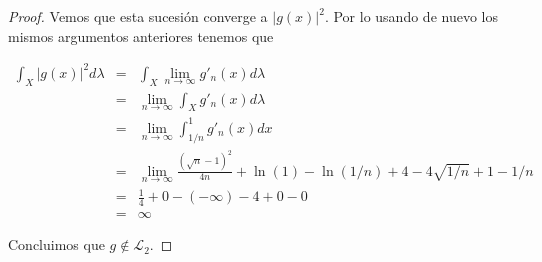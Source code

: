 \documentclass[letter,twoside,12pt]{article}
\numberwithin{equation}{section}
\begin{document}
\begin{enumerate}[label = (\textbf{\arabic*.})]
\begin{proof}
Vemos que esta sucesión converge a $|g(x)|^2 $. Por lo usando de nuevo los mismos argumentos anteriores tenemos que

\begin{eqnarray*}
 \int_X |g(x)|^2d\lambda &=& \int_X \lim_{n \to \infty} g'_n(x)d\lambda
 \\&=&\lim_{n \to \infty} \int_X g'_n(x)d\lambda 
 \\&=& \lim_{n \to \infty} \int_{1/n}^1 g'_n(x)dx
 \\&=& \lim_{n \to \infty} \frac{(\sqrt{n}-1)^2}{4n}+\ln(1)-\ln(1/n) +4-4\sqrt{1/n}+1-1/n
 \\&=& \frac{1}{4} +0 -(-\infty)-4+0 - 0
  \\&=& \infty
\end{eqnarray*}

Concluimos que  $g \not \in \mathcal{L}_2 $.

\end{proof}
\end{enumerate}



\end{document}

